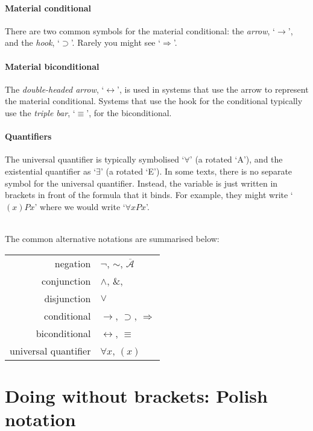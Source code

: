 \paragraph{Material conditional} There are two common symbols for the material conditional: the \emph{arrow}, `$\rightarrow$', and the \emph{hook}, `$\supset$'. Rarely you might see `$\Rightarrow$'.

\paragraph{Material biconditional} The \emph{double-headed arrow}, `$\leftrightarrow$', is used in systems that use the arrow to represent the material conditional. Systems that use the hook for the conditional typically use the \emph{triple bar}, `$\equiv$', for the biconditional.



\paragraph{Quantifiers} The universal quantifier is typically symbolised `$\forall$' (a rotated `\textsf{A}'), and the existential quantifier as `$\exists$' (a rotated `\textsf{E}'). In some texts, there is no separate symbol for the universal quantifier. Instead, the variable is just written in brackets in front of the formula that it binds. For example, they might write `$(x)Px$' where we would write `$\forall x Px$'.


\
\\The common alternative notations are summarised below:

\begin{center}
\begin{tabular}{rl} \toprule 
negation & $\neg$, $∼$, $\overline{\mathscr{A}}$\\
conjunction & $\wedge$, $\&$, {\scriptsize\textbullet}\\
disjunction & $\vee$\\
conditional & $\rightarrow$, $\supset$, $\Rightarrow$\\
biconditional & $\leftrightarrow$, $\equiv$\\
universal quantifier & $\forall x$, $(x)$\\ \bottomrule
\end{tabular}
\end{center}

\newpage
\section*{Doing without brackets: Polish notation} \label{polish}

